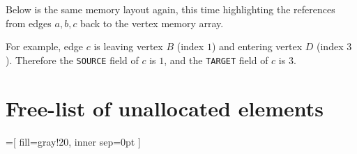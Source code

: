 \documentclass[a4paper]{article}
\begin{document}
Below is the same memory layout again, this time highlighting the references from edges $a, b, c$ back to the vertex memory array.
\begin{center}
\end{center}
For example, edge $c$ is leaving vertex $B$ (index $1$) and entering vertex $D$ (index $3$).
Therefore the \texttt{SOURCE} field of $c$ is $1$, and the \texttt{TARGET} field of $c$ is $3$.





\section{Free-list of unallocated elements}

=[
		fill=gray!20,
		inner sep=0pt
	]

\newcommand{\freespot}[2]{
  \matrix (s) at (s.south west) [spot matrix]
  {
    \node (s#2c1) {$\mathbf{-2}$}; \\
    \node (s#2c2) {#1}; \\
    \node (s#2c3) [minimum height=13.5mm] {}; \\
  };
	\node at (s#2c1.west) [text width=3mm, draw=none, xshift=-1mm, text=blue, font=\scriptsize] {#2};
	\begin{pgfonlayer}{background}
  	\node [free bg, fit=(s#2c1)(s#2c3)] {};
  \end{pgfonlayer}
}
\end{document}

